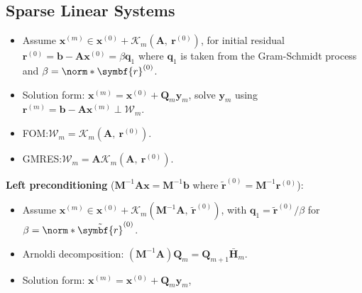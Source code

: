 \documentclass{article}
\begin{document}
\begin{minipage}[t]{126.1962963mm}
    \subsection{Sparse Linear Systems}
    \begin{itemize}
        \item Assume \(\symbf{x}^{\left( m \right)} \in
              \symbf{x}^{\left( 0 \right)} + \mathcal{K}_m\left(
              \symbf{A},\: \symbf{r}^{\left( 0 \right)} \right)\), for
              initial residual \(\symbf{r}^{\left( 0 \right)} =
              \symbf{b} - \symbf{A} \symbf{x}^{\left( 0 \right)} =
              \beta \symbf{q}_1\) where \(\symbf{q}_1\) is taken from
              the Gram-Schmidt process and \(\beta =
              \norm*{\symbf{r}^{\left( 0 \right)}}\).
        \item Solution form: \(\symbf{x}^{\left( m \right)} =
              \symbf{x}^{\left( 0 \right)} + \symbf{Q}_m \symbf{y}_m\),
              solve \(\symbf{y}_m\) using \(\symbf{r}^{\left( m
              \right)} = \symbf{b} - \symbf{A} \symbf{x}^{\left( m
              \right)} \perp \symbf{\mathcal{W}}_m\).
        \item FOM:\@ \(\symbf{\mathcal{W}}_m =
              \symbf{\mathcal{K}}_m\left( \symbf{A},\:
              \symbf{r}^{\left( 0 \right)} \right)\).
        \item GMRES:\@ \(\symbf{\mathcal{W}}_m = \symbf{A}
              \symbf{\mathcal{K}}_m\left( \symbf{A},\:
              \symbf{r}^{\left( 0 \right)} \right)\).
    \end{itemize}
    \textbf{Left preconditioning} (\(\symbf{M}^{-1} \symbf{A} \symbf{x} = \symbf{M}^{-1} \symbf{b}\) where \(\tilde{\symbf{r}}^{\left( 0 \right)} = \symbf{M}^{-1} \symbf{r}^{\left( 0 \right)}\)):
    \begin{itemize}
        \item Assume \(\symbf{x}^{\left( m \right)} \in
              \symbf{x}^{\left( 0 \right)} + \mathcal{K}_m\left(
              \symbf{M}^{-1} \symbf{A},\: \tilde{\symbf{r}}^{\left( 0
              \right)} \right)\), with \(\symbf{q}_1 =
              \tilde{\symbf{r}}^{\left( 0 \right)} / \beta\) for
              \(\beta = \norm*{\tilde{\symbf{r}}^{\left( 0 \right)}}\).
        \item Arnoldi decomposition: \(\left( \symbf{M}^{-1} \symbf{A}
              \right) \symbf{Q}_m = \symbf{Q}_{m+1}
              \bar{\symbf{H}}_m\).
        \item Solution form: \(\symbf{x}^{\left( m \right)} =
              \symbf{x}^{\left( 0 \right)} + \symbf{Q}_m \symbf{y}_m\),

\end{itemize}
\end{minipage}
\end{document}

